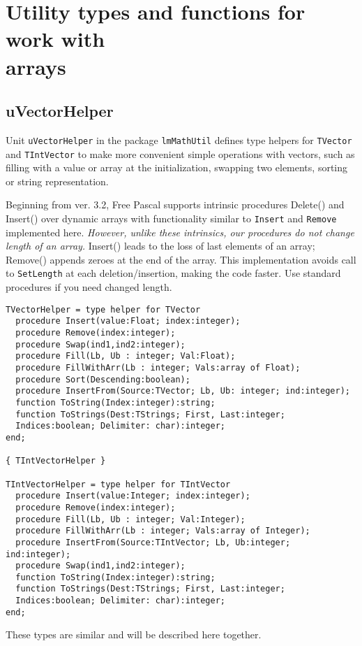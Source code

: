 \documentclass[12pt,a4paper,oneside]{article}
\newcommand{\code}[1]{\texttt{#1}}
\begin{document}
\section[Utility types and functions for work with arrays]{Utility types and functions for work with\\ arrays}
\subsection{uVectorHelper}
Unit \code{uVectorHelper} in the package \code{lmMathUtil} defines type helpers for \code{TVector} and \code{TIntVector} to make more convenient simple operations with vectors, such as filling with a value or array at the initialization, swapping two elements, sorting or string representation.

Beginning from ver. 3.2, Free Pascal supports intrinsic procedures Delete() and Insert() over dynamic arrays with functionality similar to \code{Insert} and \code{Remove} implemented here. \textit{However, unlike these intrinsics, our procedures do not change length of an array.} Insert() leads to the loss of last elements of an array; Remove() appends zeroes at the end of the array. This implementation avoids call to \code{SetLength} at each deletion/insertion, making the code faster. Use standard procedures if you need changed length.     
\begin{verbatim}
TVectorHelper = type helper for TVector
  procedure Insert(value:Float; index:integer);
  procedure Remove(index:integer);
  procedure Swap(ind1,ind2:integer);
  procedure Fill(Lb, Ub : integer; Val:Float);
  procedure FillWithArr(Lb : integer; Vals:array of Float);
  procedure Sort(Descending:boolean);
  procedure InsertFrom(Source:TVector; Lb, Ub: integer; ind:integer);
  function ToString(Index:integer):string;
  function ToStrings(Dest:TStrings; First, Last:integer;
  Indices:boolean; Delimiter: char):integer;
end;

{ TIntVectorHelper }

TIntVectorHelper = type helper for TIntVector
  procedure Insert(value:Integer; index:integer);
  procedure Remove(index:integer);
  procedure Fill(Lb, Ub : integer; Val:Integer);
  procedure FillWithArr(Lb : integer; Vals:array of Integer);
  procedure InsertFrom(Source:TIntVector; Lb, Ub:integer; ind:integer);
  procedure Swap(ind1,ind2:integer);
  function ToString(Index:integer):string;
  function ToStrings(Dest:TStrings; First, Last:integer;
  Indices:boolean; Delimiter: char):integer;
end;
\end{verbatim}
These types are similar and will be described here together.
\end{document}
